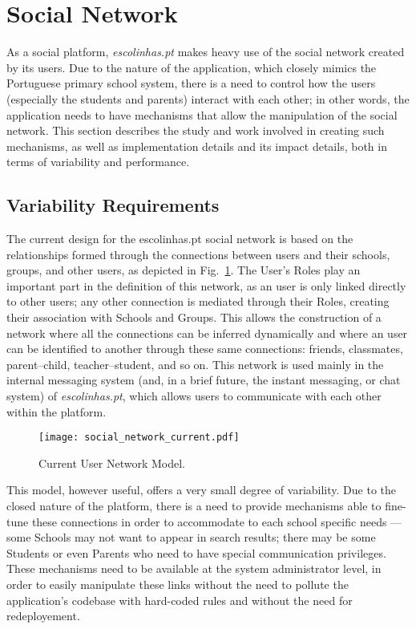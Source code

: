 \section{Social Network}\label{sec:fa_social_network}

As a social platform, \emph{escolinhas.pt} makes heavy use of the social network created by its users. Due to the nature of the application, which closely mimics the Portuguese primary school system, there is a need to control how the users (especially the students and parents) interact with each other; in other words, the application needs to have mechanisms that allow the manipulation of the social network. This section describes the study and work involved in creating such mechanisms, as well as implementation details and its impact details, both in terms of variability and performance.

\subsection{Variability Requirements}\label{sec:fa_social_network_variability_requirements}

The current design for the escolinhas.pt social network is based on the relationships formed through the connections between users and their schools, groups, and other users, as depicted in Fig.~\ref{fig:social_network_current}. The User's Roles play an important part in the definition of this network, as an user is only linked directly to other users; any other connection is mediated through their Roles, creating their association with Schools and Groups. This allows the construction of a network where all the connections can be inferred dynamically and where an user can be identified to another through these same connections: friends, classmates, parent--child, teacher--student, and so on. This network is used mainly in the internal messaging system (and, in a brief future, the instant messaging, or chat system) of \emph{escolinhas.pt}, which allows users to communicate with each other within the platform.

\begin{figure}[H]
  \centering
  \texttt{[image: social\_network\_current.pdf]}
  \caption{Current User Network Model.}
  \label{fig:social_network_current}
\end{figure}

This model, however useful, offers a very small degree of variability. Due to the closed nature of the platform, there is a need to provide mechanisms able to fine-tune these connections in order to accommodate to each school specific needs --- some Schools may not want to appear in search results; there may be some Students or even Parents who need to have special communication privileges. These mechanisms need to be available at the system administrator level, in order to easily manipulate these links without the need to pollute the application's codebase with hard-coded rules and without the need for redeployement.

